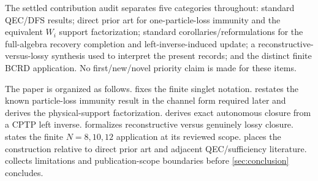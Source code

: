 The settled contribution audit separates five categories throughout: standard QEC/DFS results; direct prior art for one-particle-loss immunity and the equivalent $W_i$ support factorization; standard corollaries/reformulations for the full-algebra recovery completion and left-inverse-induced update; a reconstructive-versus-lossy synthesis used to interpret the present records; and the distinct finite BCRD application.  No first/new/novel priority claim is made for these items.

The paper is organized as follows.   fixes the finite singlet notation.   restates the known particle-loss immunity result in the channel form required later and derives the physical-support factorization.   derives exact autonomous closure from a CPTP left inverse.   formalizes reconstructive versus genuinely lossy closure.   states the finite $N=8,10,12$ application at its reviewed scope.   places the construction relative to direct prior art and adjacent QEC/sufficiency literature.   collects limitations and publication-scope boundaries before \cref{sec:conclusion} concludes.
